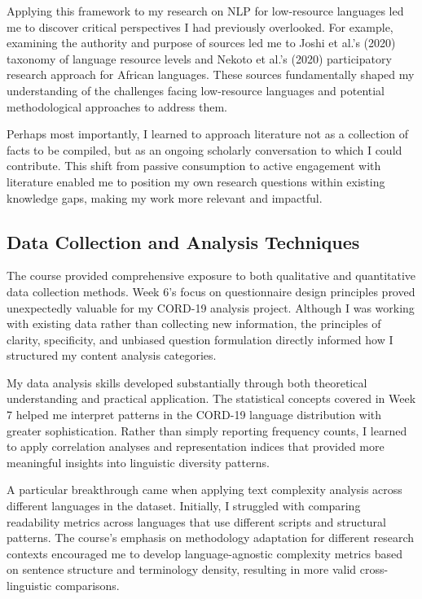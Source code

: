 \documentclass[
]{article}
\begin{document}
Applying this framework to my research on NLP for low-resource languages
led me to discover critical perspectives I had previously overlooked.
For example, examining the authority and purpose of sources led me to
Joshi et al.'s (2020) taxonomy of language resource levels and Nekoto et
al.'s (2020) participatory research approach for African languages.
These sources fundamentally shaped my understanding of the challenges
facing low-resource languages and potential methodological approaches to
address them.

Perhaps most importantly, I learned to approach literature not as a
collection of facts to be compiled, but as an ongoing scholarly
conversation to which I could contribute. This shift from passive
consumption to active engagement with literature enabled me to position
my own research questions within existing knowledge gaps, making my work
more relevant and impactful.

\subsection{Data Collection and Analysis
Techniques}\label{data-collection-and-analysis-techniques}

The course provided comprehensive exposure to both qualitative and
quantitative data collection methods. Week 6's focus on questionnaire
design principles proved unexpectedly valuable for my CORD-19 analysis
project. Although I was working with existing data rather than
collecting new information, the principles of clarity, specificity, and
unbiased question formulation directly informed how I structured my
content analysis categories.

My data analysis skills developed substantially through both theoretical
understanding and practical application. The statistical concepts
covered in Week 7 helped me interpret patterns in the CORD-19 language
distribution with greater sophistication. Rather than simply reporting
frequency counts, I learned to apply correlation analyses and
representation indices that provided more meaningful insights into
linguistic diversity patterns.

A particular breakthrough came when applying text complexity analysis
across different languages in the dataset. Initially, I struggled with
comparing readability metrics across languages that use different
scripts and structural patterns. The course's emphasis on methodology
adaptation for different research contexts encouraged me to develop
language-agnostic complexity metrics based on sentence structure and
terminology density, resulting in more valid cross-linguistic
comparisons.
\end{document}
